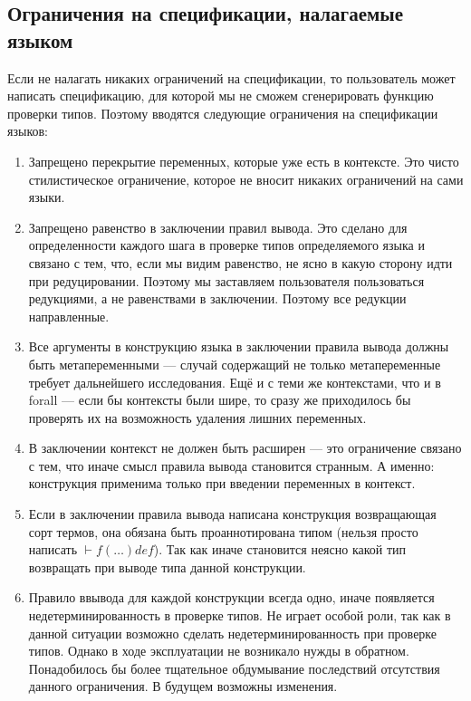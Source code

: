 \subsection{Ограничения на спецификации, налагаемые языком}\label{constraints}
Если не налагать никаких ограничений на спецификации, то пользователь может написать спецификацию, для которой мы не сможем сгенерировать функцию проверки типов. Поэтому вводятся следующие ограничения на спецификации языков:

\begin{enumerate}
\item Запрещено перекрытие переменных, которые уже есть в контексте. Это чисто стилистическое ограничение, которое не вносит никаких ограничений на сами языки.

\item \label{directed_reducts} Запрещено равенство в заключении правил вывода. Это сделано для определенности каждого шага в проверке типов определяемого языка и связано с тем, что, если мы видим равенство, не ясно в какую сторону идти при редуцировании. Поэтому мы заставляем пользователя пользоваться редукциями, а не равенствами в заключении. Поэтому все редукции направленные.

\item Все аргументы в конструкцию языка в заключении правила вывода должны быть метапеременными --- случай содержащий не только метапеременные требует дальнейшего исследования. Ещё и с теми же контекстами, что и в forall --- если бы контексты были шире, то сразу же приходилось бы проверять их на возможность удаления лишних переменных.

\item В заключении контекст не должен быть расширен --- это ограничение связано с тем, что иначе смысл правила вывода становится странным. А именно: конструкция применима только при введении переменных в контекст.

\item Если в заключении правила вывода написана конструкция возвращающая сорт термов, она обязана быть проаннотирована типом (нельзя просто написать $ \vdash f(\ldots) def$). Так как иначе становится неясно какой тип возвращать при выводе типа данной конструкции.

\item \label{one_per_fun} Правило ввывода для каждой конструкции всегда одно, иначе появляется недетерминированность в проверке типов. Не играет особой роли, так как в данной ситуации возможно сделать недетерминированность при проверке типов. Однако в ходе эксплуатации не возникало нужды в обратном. Понадобилось бы более тщательное обдумывание последствий отсутствия данного ограничения. В будущем возможны изменения.


\end{enumerate}
